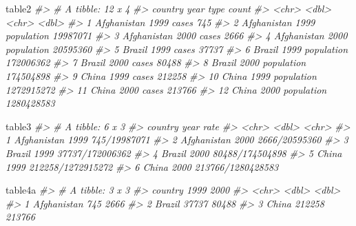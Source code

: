 \documentclass[
  xelatex, ja=standard]{bxjsbook}
\newenvironment{Shaded}{\begin{snugshade}}{\end{snugshade}}
\newcommand{\CommentTok}[1]{\textcolor[rgb]{0.56,0.35,0.01}{\textit{#1}}}
\newcommand{\NormalTok}[1]{#1}
\theoremstyle{definition}
\theoremstyle{definition}
\theoremstyle{definition}
\theoremstyle{definition}
\theoremstyle{remark}
\begin{document}
\begin{Shaded}
\begin{Highlighting}[]
\NormalTok{table2}
\CommentTok{\#\textgreater{} \# A tibble: 12 x 4}
\CommentTok{\#\textgreater{}    country      year type            count}
\CommentTok{\#\textgreater{}    \textless{}chr\textgreater{}       \textless{}dbl\textgreater{} \textless{}chr\textgreater{}           \textless{}dbl\textgreater{}}
\CommentTok{\#\textgreater{}  1 Afghanistan  1999 cases             745}
\CommentTok{\#\textgreater{}  2 Afghanistan  1999 population   19987071}
\CommentTok{\#\textgreater{}  3 Afghanistan  2000 cases            2666}
\CommentTok{\#\textgreater{}  4 Afghanistan  2000 population   20595360}
\CommentTok{\#\textgreater{}  5 Brazil       1999 cases           37737}
\CommentTok{\#\textgreater{}  6 Brazil       1999 population  172006362}
\CommentTok{\#\textgreater{}  7 Brazil       2000 cases           80488}
\CommentTok{\#\textgreater{}  8 Brazil       2000 population  174504898}
\CommentTok{\#\textgreater{}  9 China        1999 cases          212258}
\CommentTok{\#\textgreater{} 10 China        1999 population 1272915272}
\CommentTok{\#\textgreater{} 11 China        2000 cases          213766}
\CommentTok{\#\textgreater{} 12 China        2000 population 1280428583}
\end{Highlighting}
\end{Shaded}

\begin{Shaded}
\begin{Highlighting}[]
\NormalTok{table3}
\CommentTok{\#\textgreater{} \# A tibble: 6 x 3}
\CommentTok{\#\textgreater{}   country      year rate             }
\CommentTok{\#\textgreater{}   \textless{}chr\textgreater{}       \textless{}dbl\textgreater{} \textless{}chr\textgreater{}            }
\CommentTok{\#\textgreater{} 1 Afghanistan  1999 745/19987071     }
\CommentTok{\#\textgreater{} 2 Afghanistan  2000 2666/20595360    }
\CommentTok{\#\textgreater{} 3 Brazil       1999 37737/172006362  }
\CommentTok{\#\textgreater{} 4 Brazil       2000 80488/174504898  }
\CommentTok{\#\textgreater{} 5 China        1999 212258/1272915272}
\CommentTok{\#\textgreater{} 6 China        2000 213766/1280428583}
\end{Highlighting}
\end{Shaded}

\begin{Shaded}
\begin{Highlighting}[]
\NormalTok{table4a}
\CommentTok{\#\textgreater{} \# A tibble: 3 x 3}
\CommentTok{\#\textgreater{}   country     \textasciigrave{}1999\textasciigrave{} \textasciigrave{}2000\textasciigrave{}}
\CommentTok{\#\textgreater{}   \textless{}chr\textgreater{}        \textless{}dbl\textgreater{}  \textless{}dbl\textgreater{}}
\CommentTok{\#\textgreater{} 1 Afghanistan    745   2666}
\CommentTok{\#\textgreater{} 2 Brazil       37737  80488}
\CommentTok{\#\textgreater{} 3 China       212258 213766}
\end{Highlighting}
\end{Shaded}
\end{document}
